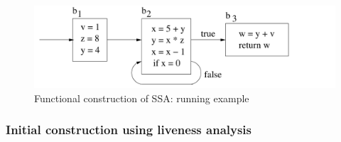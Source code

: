 
\begin{figure}
\begin{center}
\includegraphics[scale=0.5]{SSAConstructionExample1}
\end{center}
\caption{\label{fig:FunctionalCorrespondenceRunningExampleGraphic} Functional construction of SSA: running example}
\end{figure}

\subsubsection{Initial construction using liveness analysis}
\label{section:Part1:Semantics:LivenessAnalysis}


